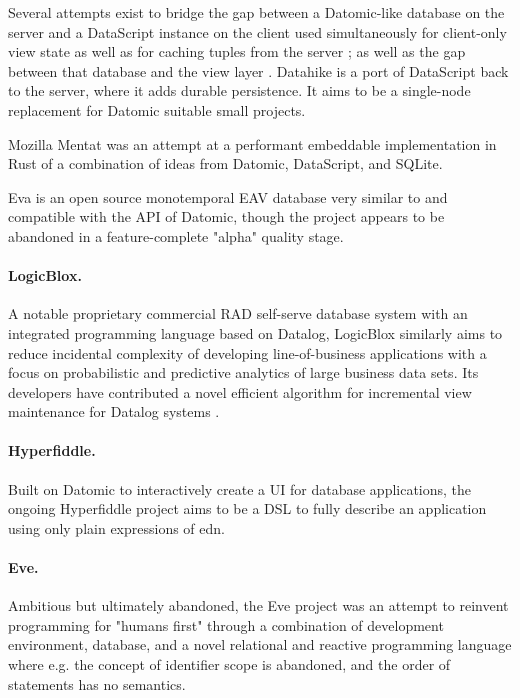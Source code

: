 Several attempts exist to bridge the gap between a Datomic-like database on the server and a DataScript instance on the client used simultaneously for client-only view state as well as for caching tuples from the server \cite{small16datscript}; as well as the gap between that database and the view layer \cite{parker15posh,krivosheev19reposh}. Datahike \cite{datahike} is a port of DataScript back to the server, where it adds durable persistence. It aims to be a single-node replacement for Datomic suitable small projects.

Mozilla Mentat \cite{mozillamentat} was an attempt at a performant embeddable implementation in Rust of a combination of ideas from Datomic, DataScript, and SQLite.

Eva \cite{eva} is an open source monotemporal EAV database very similar to and compatible with the \gls{API} of Datomic, though the project appears to be abandoned in a feature-complete "alpha" quality stage.

\paragraph{LogicBlox.} A notable proprietary commercial RAD self-serve database system with an integrated programming language based on Datalog, LogicBlox \cite{aref2015design} similarly aims to reduce incidental complexity of developing line-of-business applications with a focus on probabilistic and predictive analytics of large business data sets. Its developers have contributed a novel efficient algorithm for incremental view maintenance for Datalog systems \cite{veldhuizen2012leapfrog}.


\paragraph{Hyperfiddle.} Built on Datomic to interactively create a \gls{UI} for database applications, the ongoing Hyperfiddle project \cite{getz18hyperfiddle} aims to be a \gls{DSL} to fully describe an application using only plain expressions of \gls{edn}.


\paragraph{Eve.} Ambitious but ultimately abandoned, the Eve project \cite{eve} was an attempt to reinvent programming for "humans first" through a combination of development environment, database, and a novel relational and reactive programming language where e.g. the concept of identifier scope is abandoned, and the order of statements has no semantics.
